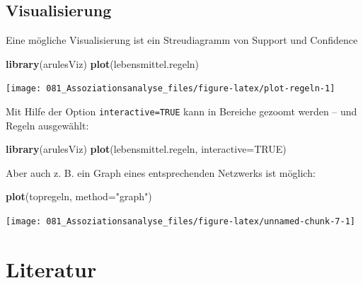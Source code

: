 \documentclass[12pt,]{book}
\makeatletter
\newenvironment{Shaded}{\begin{snugshade}}{\end{snugshade}}
\newcommand{\KeywordTok}[1]{\textcolor[rgb]{0.13,0.29,0.53}{\textbf{{#1}}}}
\newcommand{\DataTypeTok}[1]{\textcolor[rgb]{0.13,0.29,0.53}{{#1}}}
\newcommand{\StringTok}[1]{\textcolor[rgb]{0.31,0.60,0.02}{{#1}}}
\newcommand{\OtherTok}[1]{\textcolor[rgb]{0.56,0.35,0.01}{{#1}}}
\newcommand{\NormalTok}[1]{{#1}}
\newenvironment{kframe}{%
\medskip{}
\setlength{\fboxsep}{.8em}
 \def\at@end@of@kframe{}%
 \ifinner\ifhmode%
  \def\at@end@of@kframe{\end{minipage}}%
  \begin{minipage}{\columnwidth}%
 \fi\fi%
 \def\FrameCommand##1{\hskip\@totalleftmargin \hskip-\fboxsep
 \colorbox{shadecolor}{##1}\hskip-\fboxsep
     \hskip-\linewidth \hskip-\@totalleftmargin \hskip\columnwidth}%
 \MakeFramed {\advance\hsize-\width
   \@totalleftmargin\z@ \linewidth\hsize
   \@setminipage}}%
 {\par\unskip\endMakeFramed%
 \at@end@of@kframe}
\renewenvironment{Shaded}{\begin{kframe}}{\end{kframe}}
\makeatother
\begin{document}
\subsection{Visualisierung}\label{visualisierung}

Eine mögliche Visualisierung ist ein Streudiagramm von Support und
Confidence

\begin{Shaded}
\begin{Highlighting}[]
\KeywordTok{library}\NormalTok{(arulesViz)}
\KeywordTok{plot}\NormalTok{(lebensmittel.regeln)}
\end{Highlighting}
\end{Shaded}

\begin{center}\texttt{[image: 081\_Assoziationsanalyse\_files/figure-latex/plot-regeln-1]} \end{center}

Mit Hilfe der Option \texttt{interactive=TRUE} kann in Bereiche gezoomt
werden -- und Regeln ausgewählt:

\begin{Shaded}
\begin{Highlighting}[]
\KeywordTok{library}\NormalTok{(arulesViz)}
\KeywordTok{plot}\NormalTok{(lebensmittel.regeln, }\DataTypeTok{interactive=}\OtherTok{TRUE}\NormalTok{)}
\end{Highlighting}
\end{Shaded}

Aber auch z. B. ein Graph eines entsprechenden Netzwerks ist möglich:

\begin{Shaded}
\begin{Highlighting}[]
\KeywordTok{plot}\NormalTok{(topregeln, }\DataTypeTok{method=}\StringTok{"graph"}\NormalTok{)}
\end{Highlighting}
\end{Shaded}

\begin{center}\texttt{[image: 081\_Assoziationsanalyse\_files/figure-latex/unnamed-chunk-7-1]} \end{center}

\section{Literatur}\label{literatur-2}
\end{document}

